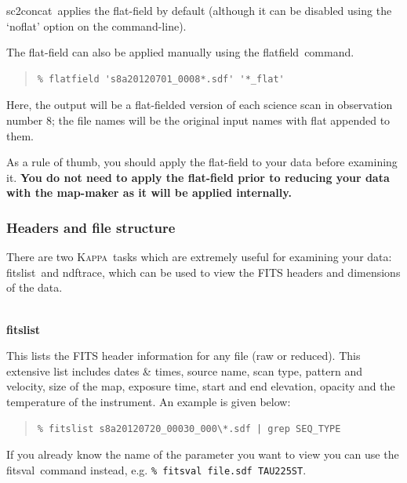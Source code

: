 \documentclass[twoside,11pt]{article}
\newcommand{\xref}[3]{#1}
\newcommand{\xlabel}[1]{}
\renewcommand{\_}{\texttt{\symbol{95}}}
\newenvironment{myquote}{\begin{quote}\begin{small}}{\end{small}\end{quote}}
\newcommand{\Kappa}{\xref{\textsc{Kappa}}{sun95}{}}
\newcommand{\task}[1]{\textsf{#1}}
\newcommand{\concat}{\xref{\task{sc2concat}}{sun258}{SC2CONCAT}}
\newcommand{\flatfield}{\xref{\task{flatfield}}{sun258}{FLATFIELD}}
\newcommand{\fitslist}{\xref{\task{fitslist}}{sun95}{FITSLIST}}
\newcommand{\fitsval}{\xref{\task{fitsval}}{sun95}{FITSVAL}}
\newcommand{\ndftrace}{\xref{\task{ndftrace}}{sun95}{NDFTRACE}}
\begin{document}
\concat\ applies the flat-field by default (although it can be
disabled using the `noflat' option on the command-line).

The flat-field can also be applied manually using the \flatfield\ command.

\begin{myquote}
\begin{verbatim}
% flatfield 's8a20120701_0008*.sdf' '*_flat'
\end{verbatim}
\end{myquote}
Here, the output will be a flat-fielded version of each science scan
in observation number 8; the file names will be the original input
names with \_flat appended to them.

As a rule of thumb, you should apply the flat-field to your data
before examining it. \textbf{You do not need to apply the flat-field
prior to reducing your data with the map-maker as it will be applied
internally.}



\subsubsection{\xlabel{header}Headers and file structure}
\label{sec:fitsheader}
There are two \Kappa\ tasks which are extremely useful for examining
your data: \fitslist\ and \ndftrace, which can be used to view the
FITS headers and dimensions of the data.
\\ \\
\begin{minipage}[t]{0.12\linewidth}
\textbf{fitslist}
\end{minipage}
\begin{minipage}[t]{0.85\linewidth}This lists the FITS header information
for any file (raw or reduced). This extensive list includes dates \& times,
source name, scan type, pattern and velocity, size of the map, exposure
time, start and end elevation, opacity and the temperature of the
instrument. An example is given below:
\begin{myquote}
\begin{verbatim}
% fitslist s8a20120720_00030_000\*.sdf | grep SEQ_TYPE
\end{verbatim}
\end{myquote}
If you already know the name of the parameter you want to view you can
use the \fitsval\ command instead, e.g.
\texttt{\% fitsval file.sdf TAU225ST}.\\
\end{minipage}
\end{document}

